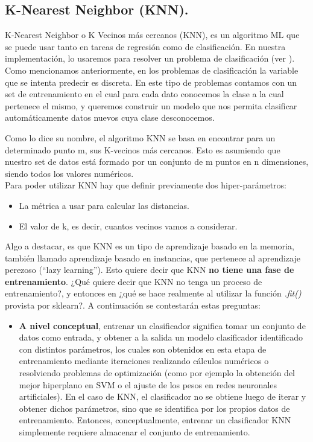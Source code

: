 \documentclass[12pt,a4paper]{article}
\begin{document}
\begin{sloppypar}
\cleardoublepage

\subsection{K-Nearest Neighbor (KNN).}\label{knn_teoria}

K-Nearest Neighbor o K Vecinos más cercanos (KNN), es un algoritmo ML que se puede usar tanto en tareas de regresión como de clasificación. En nuestra implementación, lo usaremos para resolver un problema de clasificación (ver \textit{}). Como mencionamos anteriormente, en los problemas de clasificación la variable que se intenta predecir es discreta. En este tipo de problemas contamos con un set de entrenamiento en el cual para cada dato conocemos la clase a la cual pertenece el mismo, y queremos construir un modelo que nos permita clasificar automáticamente datos nuevos cuya clase desconocemos.

Como lo dice su nombre, el algoritmo KNN se basa en encontrar para un determinado punto m, sus K-vecinos más cercanos. Esto es asumiendo que nuestro set de datos está formado por un conjunto de m puntos en n dimensiones, siendo todos los valores numéricos.\\

Para poder utilizar KNN hay que definir previamente dos hiper-parámetros:
\begin{itemize}
\item La métrica a usar para calcular las distancias.
\item El valor de k, es decir, cuantos vecinos vamos a considerar.
\end{itemize}

Algo a destacar, es que KNN es un tipo de aprendizaje basado en la memoria, también llamado aprendizaje basado en instancias, que pertenece al aprendizaje perezoso (“lazy learning”). Esto quiere decir que KNN \textbf{no tiene una fase de entrenamiento}. ¿Qué quiere decir que KNN no tenga un proceso de entrenamiento?, y entonces en \textit{} ¿qué se hace realmente al utilizar la función \textit{.fit()} provista por sklearn?. A continuación se contestarán estas preguntas:

\begin{itemize}
\item \textbf{A nivel conceptual}, entrenar un clasificador significa tomar un conjunto de datos como entrada, y obtener a la salida un modelo clasificador identificado con distintos parámetros, los cuales son obtenidos en esta etapa de entrenamiento mediante iteraciones realizando cálculos numéricos o resolviendo problemas de optimización (como por ejemplo la obtención del mejor hiperplano en SVM o el ajuste de los pesos en redes neuronales artificiales). En el caso de KNN, el clasificador no se obtiene luego de iterar y obtener dichos parámetros, sino que se identifica por los propios datos de entrenamiento. Entonces, conceptualmente, entrenar un clasificador KNN simplemente requiere almacenar el conjunto de entrenamiento.


\end{itemize}
\end{sloppypar}
\end{document}
